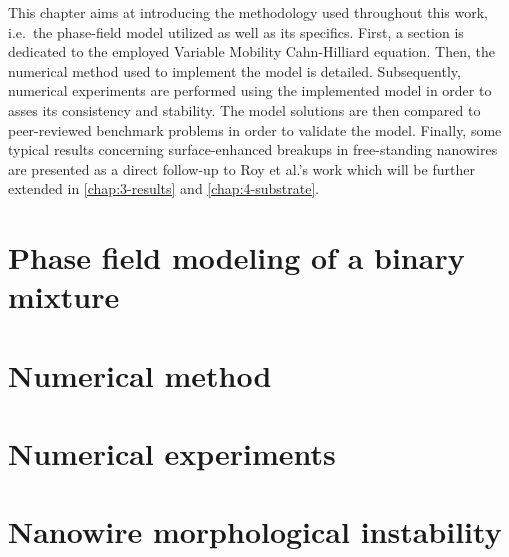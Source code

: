 This chapter aims at introducing the methodology used throughout this work, i.e.\ the phase-field model utilized as well as its specifics. First, a section is dedicated to the employed Variable Mobility Cahn-Hilliard equation. Then, the numerical method used to implement the model is detailed. Subsequently, numerical experiments are performed using the implemented model in order to asses its consistency and stability. The model solutions are then compared to peer-reviewed benchmark problems \cite{JokisaariVoorheesGuyerWarrenHeinonen2017} in order to validate the model. Finally, some typical results concerning surface-enhanced breakups in free-standing nanowires are presented as a direct follow-up to Roy et al.'s work \cite{RoyVarmaGururajan2021} which will be further extended in \autoref{chap:3-results} and \autoref{chap:4-substrate}.
\section{Phase field modeling of a binary mixture}
    
\section{Numerical method}\label{chap:2_2-numerical_method}
    
\section{Numerical experiments}\label{chap:2_3-numerical_experiments}
    
\section{Nanowire morphological instability}\label{chap:2_4-nanowire}
    
    